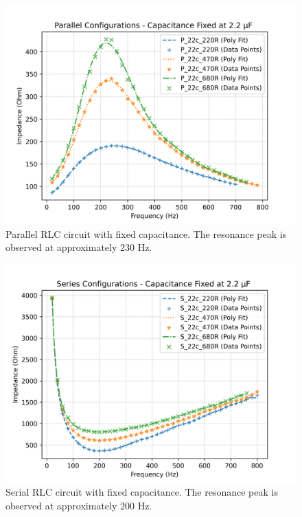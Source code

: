 \documentclass[journal]{IEEEtran}
\begin{document}
\begin{figure}[H]
    \centering
    \includegraphics[width=\linewidth]{output_plots/Fixed_C/Parallel.png}
    \caption{Parallel RLC circuit with fixed capacitance. The resonance peak is observed at approximately 230 Hz.}
    \label{fig:parallel_fixed_c}
\end{figure}

\begin{figure}[H]
    \centering
    \includegraphics[width=\linewidth]{output_plots/Fixed_C/Series.png}
    \caption{Serial RLC circuit with fixed capacitance. The resonance peak is observed at approximately 200 Hz.}
    \label{fig:series_fixed_c}
\end{figure}
\end{document}
